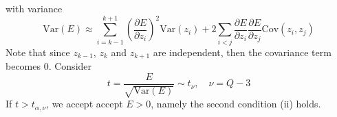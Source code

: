 with variance
\[
\text{Var}(E)\approx \sum_{i=k-1}^{k+1}\left(\frac{\partial E}{\partial z_i}\right)^2 \text{Var}(z_i) + 2\sum_{i<j}\frac{\partial E}{\partial z_i}\frac{\partial E}{\partial z_j}\text{Cov}(z_i,z_j)
\]
Note that since $z_{k-1}$, $z_k$ and $z_{k+1}$ are independent, then the covariance term becomes 0. Consider
\[
t=\frac{E}{\sqrt{\text{Var}(E)}} \sim t_\nu, \quad \nu = Q-3
\]
If $t>t_{\alpha,\nu}$, we accept accept $E>0$, namely the second condition (ii) holds.







    
